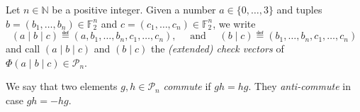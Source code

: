 \documentclass[a4paper, oneside, 12pt]{amsart}
\newcommand*{\PauliGroup}{\ensuremath{\mathcal{P}}}
\begin{document}
\begin{definition}\label{def:check-vector}
  Let \(n\in \mathbb{N}\) be a positive integer.
  Given  a number \(a \in\{0, \dots , 3\}\) and tuples \(b= (b_{1}, \dots , b_{n})\in \mathbb{F}_{2}^{n}\) and \(c=(c_{1}, \dots , c_{n}) \in \mathbb{F}_{2}^{n}\), we write
  \begin{equation*}
    (a \mid b \mid c) \eqdef
    (a, b_{1}, \dots , b_{n}, c_{1}, \dots , c_{n}), \quad \text{ and }\quad
    (b \mid c) \eqdef
    (b_{1}, \dots , b_{n}, c_{1}, \dots , c_{n})
  \end{equation*}
and call  \((a\mid b\mid c)\) and \((b\mid c)\) the \emph{(extended) check vectors} of \(\Phi(a \mid b \mid c) \in \PauliGroup_{n}\).
\end{definition}

We say that two elements \(g,h \in \PauliGroup_{n}\) \emph{commute} if \(gh= hg\).
They \emph{anti-commute} in case \(gh=-hg\).
\end{document}

